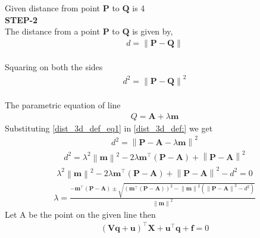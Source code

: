 \documentclass[10pt,a4paper]{report}
\let\vec\mathbf
\providecommand{\norm}[1]{\left\lVert#1\right\rVert}
\let\vec\mathbf
\providecommand{\brak}[1]{\ensuremath{\left(#1\right)}}
\begin{document}
\begin{multicols}{2}
Given distance from point $\vec{P}$ to $\vec{Q}$ is 4\\
\vspace{10mm}
\textbf{STEP-2}\vspace{5mm}\\
The distance from a point  $\vec{P}$ to $\vec{Q}$ is given by, \\ \vspace{1mm}
\begin{align}
	\label{dist_3d_def}
	d =\norm{\vec{P}-\vec{Q}}
\end{align}\\ \vspace{2mm}
Squaring on both the sides \\ \vspace{3mm}
\begin{align}
\label{dist_3d_def:}
 	d^2=\norm{\vec{P} -\vec{Q}}^2
\end{align}\\
\vspace{2mm}
\vspace{2mm}
The parametric equation of line
\begin{align}
	\label{dist_3d_def_eq1}
	Q =\vec{A} + \lambda \vec{m}
\end{align}
Substituting \eqref{dist_3d_def_eq1} in \eqref{dist_3d_def:}   we get\\
\begin{align}
 	d^2=\norm{\vec{P}-\vec{A} - \lambda \vec{m}}^2
\end{align}
\begin{multline}
\label{dist_3d_def_eq2}
d^2 =\lambda^2 \norm{\vec{m}}^2-2\lambda \vec{m}^{\top}\brak{\vec{P} 
		-\vec{A}}+\norm{\vec{P} -\vec{A}}^2
	\end{multline}
	\begin{multline}
\label{dist_3d_def_eq2}
\lambda^2 \norm{\vec{m}}^2-2\lambda \vec{m}^{\top}\brak{\vec{P} 
		-\vec{A}}
		+\norm{\vec{P} -\vec{A}}^2-d^2=0
	\end{multline}
	    {\small
		    \begin{align}
			    \label{eq:cbse-2020-circ_lam}
		\lambda = \frac{-\vec{m}^{\top}(\vec{P}-\vec{A})\pm \sqrt{\brak{\vec{m}^{\top}(\vec{P}-\vec{A})}^2 -\norm{\vec{m}}^2\brak{\norm{\vec{P}-\vec{A}}^2 - d^2 }}}{\norm{\vec{m}}^2}
		    \end{align}
		    }
	Let A be the point on the given line then
\begin{align}
	\vec{(Vq+u)}^{\top}\vec{X}+\vec{u}^{\top}\vec{q}+\vec{f} =0 
\end{align}\\ 


\end{multicols}
\end{document}
